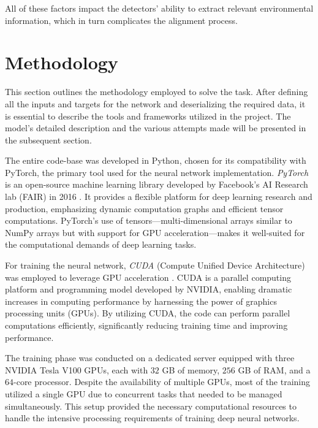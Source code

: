 All of these factors impact the detectors' ability to extract relevant environmental information, which in turn complicates the alignment process. 

\section{Methodology}

This section outlines the methodology employed to solve the task. After defining all the inputs and targets for the network and deserializing the required data, it is essential to describe the tools and frameworks utilized in the project. The model's detailed description and the various attempts made will be presented in the subsequent section.

The entire code-base was developed in Python, chosen for its compatibility with PyTorch, the primary tool used for the neural network implementation. \textit{PyTorch} is an open-source machine learning library developed by Facebook's AI Research lab (FAIR) in 2016 \cite{NEURIPS2019_9015}. It provides a flexible platform for deep learning research and production, emphasizing dynamic computation graphs and efficient tensor computations. PyTorch's use of tensors—multi-dimensional arrays similar to NumPy \cite{harris2020array} arrays but with support for GPU acceleration—makes it well-suited for the computational demands of deep learning tasks.

For training the neural network, \textit{CUDA} (Compute Unified Device Architecture) was employed to leverage GPU acceleration \cite{cuda}. CUDA is a parallel computing platform and programming model developed by NVIDIA, enabling dramatic increases in computing performance by harnessing the power of graphics processing units (GPUs). By utilizing CUDA, the code can perform parallel computations efficiently, significantly reducing training time and improving performance.

The training phase was conducted on a dedicated server equipped with three NVIDIA Tesla V100 GPUs, each with $32$ GB of memory, $256$ GB of RAM, and a $64$-core processor. Despite the availability of multiple GPUs, most of the training utilized a single GPU due to concurrent tasks that needed to be managed simultaneously. This setup provided the necessary computational resources to handle the intensive processing requirements of training deep neural networks.
